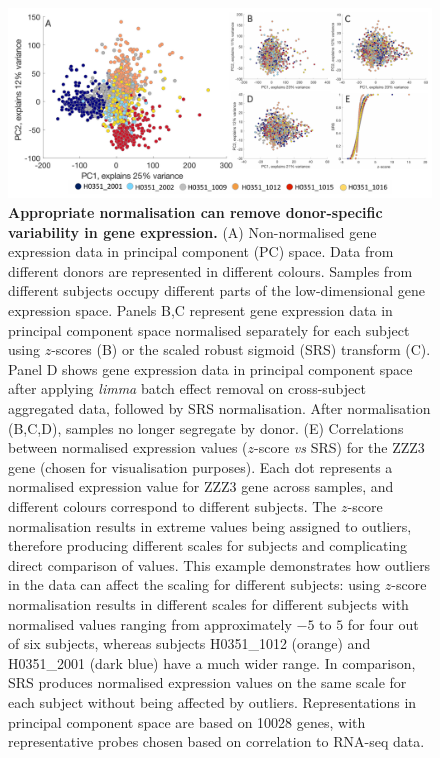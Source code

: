 \begin{figure}[h!]
  \centering
    \includegraphics[width=1\textwidth]{Chapter4/Ch4Fig6.pdf}
\caption{\textbf{Appropriate normalisation can remove donor-specific variability in gene expression.}
(A) Non-normalised gene expression data in principal component (PC) space. Data from different donors are represented in different colours. Samples from different subjects occupy different parts of the low-dimensional gene expression space. Panels B,C represent gene expression data in principal component space normalised separately for each subject using $z$-scores
(B) or the scaled robust sigmoid (SRS) transform
(C). Panel D shows gene expression data in principal component space after applying \textit{limma} batch effect removal \mbox{\citep{Ritchie2015}} on cross-subject aggregated data, followed by SRS normalisation. After normalisation (B,C,D), samples no longer segregate by donor.
(E) Correlations between normalised expression values ($z$-score \textit{vs} SRS) for the ZZZ3 gene (chosen for visualisation purposes).
Each dot represents a normalised expression value for ZZZ3 gene across samples, and different colours correspond to different subjects. The $z$-score normalisation results in extreme values being assigned to outliers, therefore producing different scales for subjects and complicating direct comparison of values.
This example demonstrates how outliers in the data can affect the scaling for different subjects: using $z$-score normalisation results in different scales for different subjects with normalised values ranging from approximately $-5$ to $5$ for four out of six subjects, whereas subjects H0351\_1012 (orange) and H0351\_2001 (dark blue) have a much wider range. In comparison, SRS produces normalised expression values on the same scale for each subject without being affected by outliers.
Representations in principal component space are based on \num{10028} genes, with representative probes chosen based on correlation to RNA-seq data. }
\label{fig:Ch4Fig6}
\end{figure}

